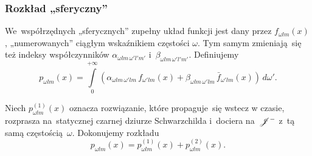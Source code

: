\documentclass[10pt,t]{beamer}
\begin{document}
\begin{frame}
  \frametitle{Rozkład „sferyczny”}


  We~współrzędnych „sferycznych” zupełny układ funkcji jest dany
  przez $f_{ \omega l m }( x )$, „numerowanych” ciągłym wskaźnikiem
  częstości $\omega$. Tym samym zmieniają~się też indeksy
  współczynników $\alpha_{ \omega l m\, \omega' l' m' }$ i~$\beta_{ \omega l m\, \omega' l' m' }$. Definiujemy
  \begin{equation}
    \label{eq:Promieniowanie-Hawkinga-44}
    p_{ \omega l m }( x ) =
    \int\limits_{ 0 }^{ +\infty } ( \alpha_{ \omega l m\, \omega' l m } \, f_{ \omega' l m }( x )
    + \beta_{ \omega l m\, \omega' l m } \, \bar{ f }_{ \omega' l m }( x ) ) \, d \omega'.
  \end{equation}

  Niech $p_{ \omega l m }^{ ( 1 ) }( x )$ oznacza rozwiązanie, które
  propaguje~się wstecz w czasie, rozprasza na~statycznej czarnej
  dziurze Schwarzchilda i~dociera na~$\mathcal{J}^{ - }$ z~tą samą
  częstością~$\omega$. Dokonujemy rozkładu
  \begin{equation}
    \label{eq:Promieniowanie-Hawkinga-45}
    p_{ \omega l m }( x ) =
    p_{ \omega l m }^{ ( 1 ) }( x ) + p_{ \omega l m }^{ ( 2 ) }( x ).
  \end{equation}

\end{frame}
\end{document}
